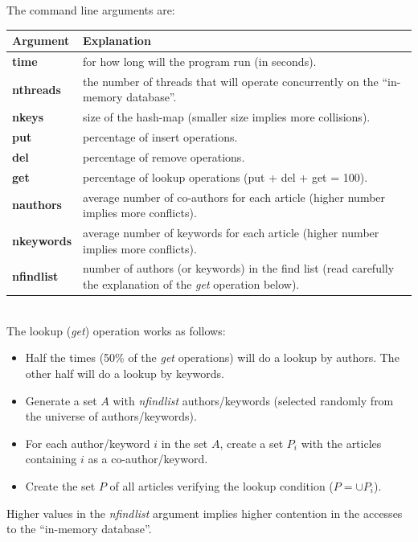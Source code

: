 \documentclass[a4paper,12pt]{article}
\begin{document}
\clearpage

The command line arguments are:

\begin{tabulary}{\linewidth}{>{\bfseries}lJ}
  \toprule
  \textbf{Argument} & \textbf{Explanation}\\
  \midrule
  time     &	for how long will the program run (in seconds).\\
  nthreads     &	the number of threads  that will operate concurrently on the “in-memory database”.\\
  nkeys      &	size of the hash-map (smaller size implies more collisions).\\
  put      &	percentage of insert operations.\\
  del      &	percentage of remove operations.\\
  get      &	percentage of lookup operations (put + del + get = 100).\\
  nauthors     &	average number of co-authors for each article (higher number implies more conflicts).\\
  nkeywords      &	average number of keywords for each article (higher number implies more conflicts).\\
  nfindlist      &	number of authors (or keywords) in the find list (read carefully the explanation of the \emph{get} operation below).\\
  \bottomrule
\end{tabulary}

~\\

The lookup (\emph{get}) operation works as follows:
\begin{itemize}
\item Half the times (50\% of the \emph{get} operations) will do a lookup by authors. The other half will do a lookup by keywords.
\item Generate a set $A$ with \emph{nfindlist} authors/keywords (selected randomly from the universe of authors/keywords).
\item For each author/keyword $i$ in the set $A$, create a set $P_i$ with the articles containing $i$ as a co-author/keyword.
\item Create the set $P$ of all articles verifying the lookup condition ($P = \cup P_i$).
\end{itemize}


Higher values in the \emph{nfindlist} argument implies higher contention in the accesses to the “in-memory database”.
\end{document}
